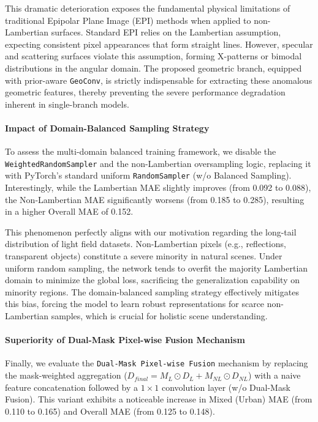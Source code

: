 \documentclass[lettersize,journal]{IEEEtran}
\begin{document}
This dramatic deterioration exposes the fundamental physical limitations of traditional Epipolar Plane Image (EPI) methods when applied to non-Lambertian surfaces. Standard EPI relies on the Lambertian assumption, expecting consistent pixel appearances that form straight lines. However, specular and scattering surfaces violate this assumption, forming X-patterns or bimodal distributions in the angular domain. The proposed geometric branch, equipped with prior-aware \texttt{GeoConv}, is strictly indispensable for extracting these anomalous geometric features, thereby preventing the severe performance degradation inherent in single-branch models.

\paragraph{Impact of Domain-Balanced Sampling Strategy}
To assess the multi-domain balanced training framework, we disable the \texttt{WeightedRandomSampler} and the non-Lambertian oversampling logic, replacing it with PyTorch's standard uniform \texttt{RandomSampler} (w/o Balanced Sampling). Interestingly, while the Lambertian MAE slightly improves (from 0.092 to 0.088), the Non-Lambertian MAE significantly worsens (from 0.185 to 0.285), resulting in a higher Overall MAE of 0.152.

This phenomenon perfectly aligns with our motivation regarding the long-tail distribution of light field datasets. Non-Lambertian pixels (e.g., reflections, transparent objects) constitute a severe minority in natural scenes. Under uniform random sampling, the network tends to overfit the majority Lambertian domain to minimize the global loss, sacrificing the generalization capability on minority regions. The domain-balanced sampling strategy effectively mitigates this bias, forcing the model to learn robust representations for scarce non-Lambertian samples, which is crucial for holistic scene understanding.

\paragraph{Superiority of Dual-Mask Pixel-wise Fusion Mechanism}
Finally, we evaluate the \texttt{Dual-Mask Pixel-wise Fusion} mechanism by replacing the mask-weighted aggregation ($D_{final} = M_L \odot D_L + M_{NL} \odot D_{NL}$) with a naive feature concatenation followed by a $1\times1$ convolution layer (w/o Dual-Mask Fusion). This variant exhibits a noticeable increase in Mixed (Urban) MAE (from 0.110 to 0.165) and Overall MAE (from 0.125 to 0.148). 
\end{document}
